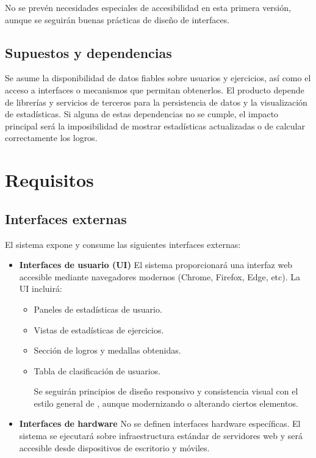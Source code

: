 No se prevén necesidades especiales de accesibilidad en esta primera versión, aunque se seguirán buenas prácticas de diseño de interfaces.

\subsection{Supuestos y dependencias}

Se asume la disponibilidad de datos fiables sobre usuarios y ejercicios, así como el acceso a interfaces o mecanismos que permitan obtenerlos. El producto depende de librerías y servicios de terceros para la persistencia de datos y la visualización de estadísticas. Si alguna de estas dependencias no se cumple, el impacto principal será la imposibilidad de mostrar estadísticas actualizadas o de calcular correctamente los logros.

\section{Requisitos} 
\label{sec:requisitos}

\subsection{Interfaces externas}

El sistema expone y consume las siguientes interfaces externas:
\begin{itemize}
    \item \textbf{Interfaces de usuario (UI)}
 El sistema proporcionará una interfaz web accesible mediante navegadores modernos (Chrome, Firefox, Edge, etc).
 La UI incluirá:
    \begin{itemize}
        \item Paneles de estadísticas de usuario.
        \item Vistas de estadísticas de ejercicios.
        \item Sección de logros y medallas obtenidas.
        \item Tabla de clasificación de usuarios.

 Se seguirán principios de diseño responsivo y consistencia visual con el estilo general de \aer, aunque modernizando o alterando ciertos elementos.
    \end{itemize}

    \item \textbf{Interfaces de hardware}
 No se definen interfaces hardware específicas. El sistema se ejecutará sobre infraestructura estándar de servidores web y será accesible desde dispositivos de escritorio y móviles.
\end{itemize}

